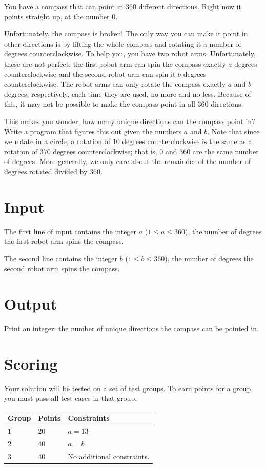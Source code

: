 
You have a compass that can point in $360$ different directions. Right now it points straight up, at the number $0$.

Unfortunately, the compass is broken! The only way you can make it point in other directions
is by lifting the whole compass and rotating it a number of degrees counterclockwise. To help you, you have
two robot arms. Unfortunately, these are not perfect: the first robot arm can
spin the compass exactly $a$ degrees counterclockwise and the second robot arm can spin it $b$ degrees counterclockwise.
The robot arms can only rotate the compass exactly $a$ and $b$ degrees, respectively, each time
they are used, no more and no less.
Because of this, it may not be possible to make the compass point
in all $360$ directions.

This makes you wonder, how many unique directions can the compass point in? Write a program
that figures this out given the numbers $a$ and $b$. Note that since we rotate in a circle,
a rotation of $10$ degrees counterclockwise is the same as a rotation of $370$ degrees counterclockwise;
that is, $0$ and $360$ are the same number of degrees.
More generally, we only care about the remainder of the number of degrees rotated divided by $360$.


\section*{Input}
The first line of input contains the integer $a$ ($1 \leq a \leq 360$),
the number of degrees the first robot arm spins the compass.

The second line contains the integer $b$ ($1 \leq b \leq 360$),
the number of degrees the second robot arm spins the compass.

\section*{Output}
Print an integer: the number of unique directions the compass can be pointed in.

\section*{Scoring}
Your solution will be tested on a set of test groups.
To earn points for a group, you must pass all test cases in that group.

\noindent
\begin{tabular}{| l | l | p{12cm} |}
  \hline
  \textbf{Group} & \textbf{Points} & \textbf{Constraints} \\ \hline
  $1$    & $20$  & $a = 13$ \\ \hline
  $2$    & $40$  & $a = b$ \\ \hline
  $3$    & $40$  & No additional constraints. \\ \hline
\end{tabular}

